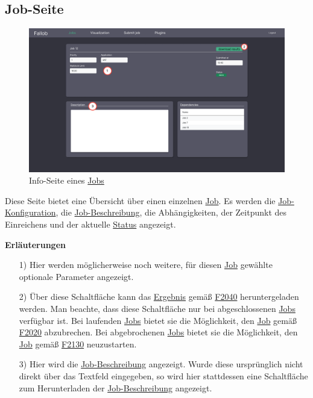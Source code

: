 \subsection{Job-Seite}
\label{pages:job-page}
\begin{figure}[H]
    \centering
    \includegraphics[width=\textwidth]{images-interface/v5_interface/job_info_page_5.pdf}
    \caption{Info-Seite eines \hyperref[B:Jobs]{Jobs}}
    \label{fig:job-page}
\end{figure}
Diese Seite bietet eine Übersicht über einen einzelnen \hyperref[B:Jobs]{Job}. Es werden die \hyperref[B:Job-Konfiguration]{Job-Konfiguration}, die \hyperref[B:Job-Beschreibung]{Job-Beschreibung}, die Abhängigkeiten, der Zeitpunkt des Einreichens und der aktuelle \hyperref[B:Job-Status]{Status} angezeigt.

\textbf{Erläuterungen}
\begin{itemize}
    \item[1)] Hier werden möglicherweise noch weitere, für diesen \hyperref[B:Jobs]{Job} gewählte optionale Parameter angezeigt.
    \item[2)] Über diese Schaltfläche kann das \hyperref[B:Job-Ergebnis]{Ergebnis} gemäß \hyperref[FA:Web-Interface:Herunterladen eines einzelnen Ergebnisses]{F2040} heruntergeladen werden. Man beachte, dass diese Schaltfläche nur bei abgeschlossenen \hyperref[B:Jobs]{Jobs} verfügbar ist. Bei laufenden \hyperref[B:Jobs]{Jobs} bietet sie die Möglichkeit, den \hyperref[B:Jobs]{Job} gemäß \hyperref[FA:Web-Interface:Abbruch eines einzelnen Jobs]{F2020} abzubrechen. Bei abgebrochenen \hyperref[B:Jobs]{Jobs} bietet sie die Möglichkeit, den \hyperref[B:Jobs]{Job} gemäß \hyperref[FA:Web-Interface:Neustart]{F2130} neuzustarten.
    \item[3)] Hier wird die \hyperref[B:Job-Beschreibung]{Job-Beschreibung} angezeigt. Wurde diese ursprünglich nicht direkt über das Textfeld eingegeben, so wird hier stattdessen eine Schaltfläche zum Herunterladen der \hyperref[B:Job-Beschreibung]{Job-Beschreibung} angezeigt.
\end{itemize}

